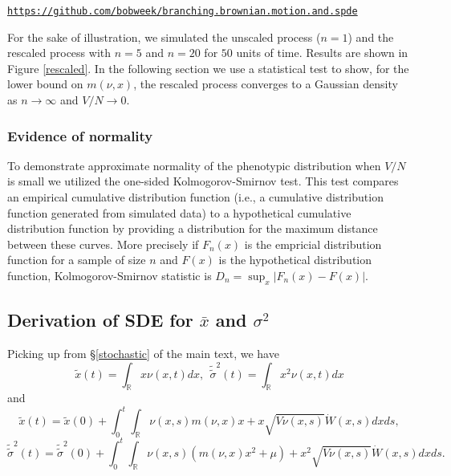 \documentclass[]{article}
\begin{document}
\texttt{\url{https://github.com/bobweek/branching.brownian.motion.and.spde}}

For the sake of illustration, we simulated the unscaled process
(\(n=1\)) and the rescaled process with \(n=5\) and \(n=20\) for \(50\)
units of time. Results are shown in Figure \ref{rescaled}. In the
following section we use a statistical test to show, for the lower bound
on \(m(\nu,x)\), the rescaled process converges to a Gaussian density as
\(n\to\infty\) and \(V/N\to0\).

\hypertarget{evidence-of-normality}{%
\subsubsection{\texorpdfstring{Evidence of normality
\label{ev_normal}}{Evidence of normality }}\label{evidence-of-normality}}

To demonstrate approximate normality of the phenotypic distribution when
\(V/N\) is small we utilized the one-sided Kolmogorov-Smirnov test. This
test compares an empirical cumulative distribution function (i.e., a
cumulative distribution function generated from simulated data) to a
hypothetical cumulative distribution function by providing a
distribution for the maximum distance between these curves. More
precisely if \(F_n(x)\) is the empricial distribution function for a
sample of size \(n\) and \(F(x)\) is the hypothetical distribution
function, Kolmogorov-Smirnov statistic is \(D_n=\sup_x|F_n(x)-F(x)|\).

\hypertarget{derivation-of-sde-for-bar-x-and-sigma2}{%
\subsection{\texorpdfstring{Derivation of SDE for \(\bar x\) and
\(\sigma^2\)
\label{SDE_DERIV}}{Derivation of SDE for \textbackslash{}bar x and \textbackslash{}sigma\^{}2 }}\label{derivation-of-sde-for-bar-x-and-sigma2}}

Picking up from \S\ref{stochastic} of the main text, we have
\begin{equation}
\tilde x(t)=\int_\mathbb{R}x\nu(x,t)dx, \ \ \tilde{\tilde\sigma}^2(t)=\int_\mathbb{R}x^2\nu(x,t)dx
\end{equation} and \begin{equation}\label{xtilde}
\tilde x(t)=\tilde x(0)+\int_0^t\int_\mathbb{R}\nu(x,s)m(\nu,x)x+x\sqrt{V\nu(x,s)}\dot W(x,s)dxds,
\end{equation} \begin{equation}\label{stilde}
\tilde{\tilde\sigma}^2(t)=\tilde{\tilde\sigma}^2(0)+\int_0^t\int_\mathbb{R}\nu(x,s)\left(m(\nu,x)x^2+\mu\right)+x^2\sqrt{V\nu(x,s)}\dot W(x,s)dxds.
\end{equation}
\end{document}

